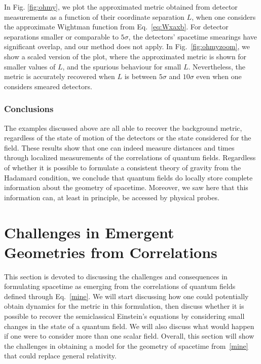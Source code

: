\documentclass[letterpaper,12pt,titlepage,oneside,final]{book}
\begin{document}
    In Fig. \ref{fig:ohmy}, we plot the approximated metric obtained from detector measurements as a function of their coordinate separation $L$, when one considers the approximate Wightman function from Eq.~\eqref{eq:Wxaxb}. For detector separations smaller or comparable to $5\sigma$, the detectors' spacetime smearings have significant overlap, and our method does not apply. In Fig.~\ref{fig:ohmyzoom}, we show a scaled version of the plot, where the approximated metric is shown for smaller values of $L$, and the spurious behaviour for small $L$. Nevertheless, the metric is accurately recovered when $L$ is between $5\sigma$ and $10\sigma$ even when one considers smeared detectors.
    

\subsubsection*{Conclusions}

The examples discussed above are all able to recover the background metric, regardless of the state of motion of the detectors or the state considered for the field. These results show that one can indeed measure distances and times through localized measurements of the correlations of quantum fields. Regardless of whether it is possible to formulate a consistent theory of gravity from the Hadamard condition, we conclude that quantum fields do locally store complete information about the geometry of spacetime. Moreover, we saw here that this information can, at least in principle, be accessed by physical probes.

\section{Challenges in  Emergent Geometries from Correlations}\label{sec:resonable?}

This section is devoted to discussing the challenges and consequences in formulating spacetime as emerging from the correlations of quantum fields defined through Eq.~\eqref{mine}. We will start discussing how one could potentially obtain dynamics for the metric in this formulation, then discuss whether it is possible to recover the semiclassical Einstein's equations by considering small changes in the state of a quantum field. We will also discuss what would happen if one were to consider more than one scalar field. Overall, this section will show the challenges in obtaining a model for the geometry of spacetime from~\eqref{mine} that could replace general relativity.
\end{document}
